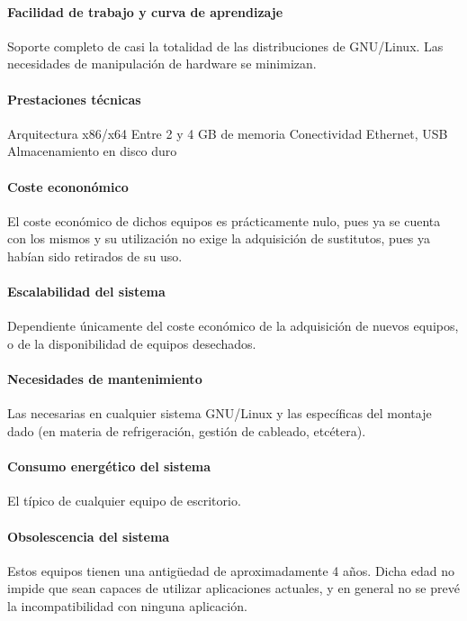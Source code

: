 \paragraph{Facilidad de trabajo y curva de aprendizaje}

Soporte completo de casi la totalidad de las distribuciones de GNU/Linux.
Las necesidades de manipulación de hardware se minimizan.

\paragraph{Prestaciones técnicas}
Arquitectura x86/x64
Entre 2 y 4 GB de memoria
Conectividad Ethernet, USB
Almacenamiento en disco duro
\paragraph{Coste econonómico}

El coste económico de dichos equipos es prácticamente nulo, pues ya se cuenta con los mismos y su utilización no exige la adquisición de sustitutos, pues ya habían sido retirados de su uso.

\paragraph{Escalabilidad del sistema}

Dependiente únicamente del coste económico de la adquisición de nuevos equipos, o de la disponibilidad de equipos desechados.

\paragraph{Necesidades de mantenimiento}

Las necesarias en cualquier sistema GNU/Linux y las específicas del montaje dado (en materia de refrigeración, gestión de cableado, etcétera).

\paragraph{Consumo energético del sistema}

El típico de cualquier equipo de escritorio.

\paragraph{Obsolescencia del sistema}

Estos equipos tienen una antigüedad de aproximadamente 4 años. Dicha edad no impide que sean capaces de utilizar aplicaciones actuales, y en general no se prevé la incompatibilidad con ninguna aplicación.

